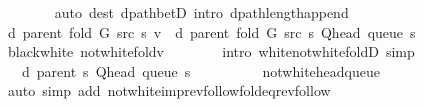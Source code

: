 \begin{isabellebody}
\ \ \ \ \ \ \isamarkupfalse%
\ {\isacharparenleft}{\kern0pt}auto\ dest{\isacharcolon}{\kern0pt}\ dpath{\isacharunderscore}{\kern0pt}betD{\isacharparenleft}{\kern0pt}{}{\isacharminus}{\kern0pt}{}{\isacharparenright}{\kern0pt}\ intro{\isacharcolon}{\kern0pt}\ dpath{\isacharunderscore}{\kern0pt}length{\isacharunderscore}{\kern0pt}append{\isacharunderscore}{\kern0pt}{}{\isacharparenright}{\kern0pt}\isanewline
\isanewline
\ \ \ \ \isamarkupfalse%
\ {\isachardoublequoteopen}d\ {\isacharparenleft}{\kern0pt}parent\ {\isacharparenleft}{\kern0pt}fold\ G\ src\ s{\isacharparenright}{\kern0pt}{\isacharparenright}{\kern0pt}\ v\ {\isacharequal}{\kern0pt}\ d\ {\isacharparenleft}{\kern0pt}parent\ {\isacharparenleft}{\kern0pt}fold\ G\ src\ s{\isacharparenright}{\kern0pt}{\isacharparenright}{\kern0pt}\ {\isacharparenleft}{\kern0pt}Q{\isacharunderscore}{\kern0pt}head\ {\isacharparenleft}{\kern0pt}queue\ s{\isacharparenright}{\kern0pt}{\isacharparenright}{\kern0pt}\ {\isacharplus}{\kern0pt}\ {}{\isachardoublequoteclose}\isanewline
\ \ \ \ \ \ \isamarkupfalse%
\ black{\isacharunderscore}{\kern0pt}white\ not{\isacharunderscore}{\kern0pt}white{\isacharunderscore}{\kern0pt}fold{\isacharunderscore}{\kern0pt}v\isanewline
\ \ \ \ \ \ \isamarkupfalse%
\ {\isacharparenleft}{\kern0pt}intro\ white{\isacharunderscore}{\kern0pt}not{\isacharunderscore}{\kern0pt}white{\isacharunderscore}{\kern0pt}foldD{\isacharparenleft}{\kern0pt}{}{\isacharparenright}{\kern0pt}{\isacharparenright}{\kern0pt}\ simp\isanewline
\ \ \ \ \isamarkupfalse%
\ \isamarkupfalse%
\ {\isachardoublequoteopen}{\isachardot}{\kern0pt}{\isachardot}{\kern0pt}{\isachardot}{\kern0pt}\ {\isacharequal}{\kern0pt}\ d\ {\isacharparenleft}{\kern0pt}parent\ s{\isacharparenright}{\kern0pt}\ {\isacharparenleft}{\kern0pt}Q{\isacharunderscore}{\kern0pt}head\ {\isacharparenleft}{\kern0pt}queue\ s{\isacharparenright}{\kern0pt}{\isacharparenright}{\kern0pt}\ {\isacharplus}{\kern0pt}\ {}{\isachardoublequoteclose}\isanewline
\ \ \ \ \ \ \isamarkupfalse%
\ not{\isacharunderscore}{\kern0pt}white{\isacharunderscore}{\kern0pt}head{\isacharunderscore}{\kern0pt}queue\isanewline
\ \ \ \ \ \ \isamarkupfalse%
\ {\isacharparenleft}{\kern0pt}auto\ simp\ add{\isacharcolon}{\kern0pt}\ not{\isacharunderscore}{\kern0pt}white{\isacharunderscore}{\kern0pt}imp{\isacharunderscore}{\kern0pt}rev{\isacharunderscore}{\kern0pt}follow{\isacharunderscore}{\kern0pt}fold{\isacharunderscore}{\kern0pt}eq{\isacharunderscore}{\kern0pt}rev{\isacharunderscore}{\kern0pt}follow{\isacharparenright}{\kern0pt}\isanewline

\end{isabellebody}
